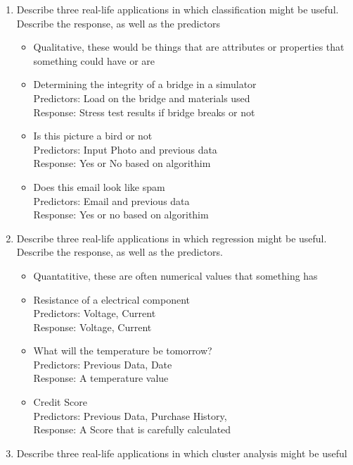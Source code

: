 \documentclass[11pt]{article}
\newcommand\tab[1][1cm]{\hspace*{#1}}
\begin{document}
\begin{enumerate}[label=(\alph*)]
    \item Describe three real-life applications in which classification might be useful. Describe the response, as well as the predictors
          \begin{itemize}
              \item Qualitative, these would be things that are attributes or properties that something could have or are
              \item Determining the integrity of a bridge in a simulator \\\tab Predictors: Load on the bridge and materials used \\\tab Response: Stress test results if bridge breaks or not
              \item Is this picture a bird or not \\\tab Predictors: Input Photo and previous data\\\tab Response: Yes or No based on algorithim
              \item Does this email look like spam \\\tab Predictors: Email and previous data\\\tab Response: Yes or no based on algorithim
          \end{itemize}
    \item Describe three real-life applications in which regression might be useful. Describe the response, as well as the predictors.
          \begin{itemize}
              \item Quantatitive, these are often numerical values that something has
              \item Resistance of a electrical component \\\tab Predictors: Voltage, Current \\\tab Response: Voltage, Current
              \item What will the temperature be tomorrow? \\\tab Predictors: Previous Data, Date\\\tab Response: A temperature value
              \item Credit Score\\\tab Predictors: Previous Data, Purchase History, \\\tab Response: A Score that is carefully calculated
          \end{itemize}
    \item Describe three real-life applications in which cluster analysis might be useful

\end{enumerate}
\end{document}
